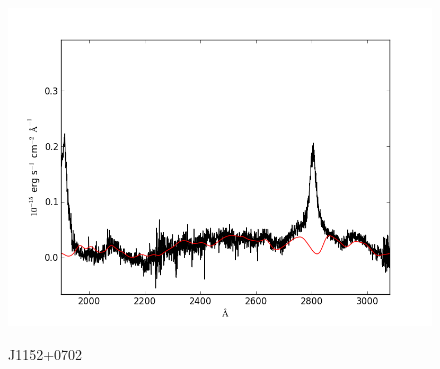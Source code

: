 \documentclass[usenatbib]{mn2e}
\begin{document}
\begin{figure}
\begin{center}
\vspace{5mm}
\includegraphics[width=0.49\linewidth,angle=0]{./red/fe_fit_SBB_1.png}\\

\end{center} 
\caption{J1152+0702 \label{fig:landscape}}   
\end{figure}

\newpage
\end{document}
